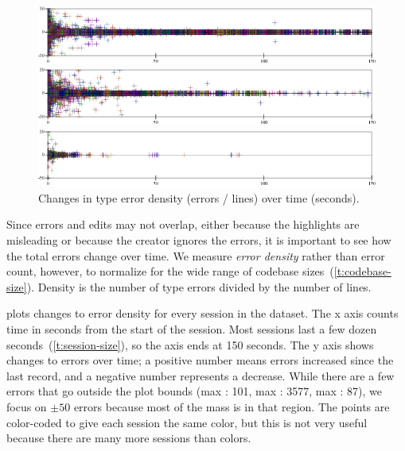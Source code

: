 \documentclass[english,submission,cleveref]{programming}
\begin{document}
\begin{figure}[t]\centering

  \mnocheck{}
  \includegraphics[width=\columnwidth]{img/error-count-nocheck-row--te-density-diff.pdf}
  \smallskip

  \mnonstrict{}
  \includegraphics[width=\columnwidth]{img/error-count-nonstrict-row--te-density-diff.pdf}
  \smallskip

  \mstrict{}
  \includegraphics[width=\columnwidth]{img/error-count-strict-row--te-density-diff.pdf}
  \caption{Changes in type error density (errors / lines) over time (seconds).}
  \label{f:error-density}
\end{figure}

Since errors and edits may not overlap, either because the highlights
are misleading or because the creator ignores the errors, it is important
to see how the total errors change over time.
We measure \emph{error density} rather than error count, however,
to normalize for the wide range of codebase sizes~(\cref{t:codebase-size}).
Density is the number of type errors divided by the number of lines.

 plots changes to error density for every session in the dataset.
The x axis counts time in seconds from the start of the session.
Most sessions last a few dozen seconds~(\cref{t:session-size}), so the axis
ends at 150 seconds.
The y axis shows changes to errors over time; a positive number means errors
increased since the last record, and a negative number represents a decrease.
While there are a few errors that go outside the plot bounds
(max \mnocheck{}: 101, max \mnonstrict{}: 3577, max \mstrict{}: 87), we focus
on $\pm{}50$ errors because most of the mass is in that region.
The points are color-coded to give each session the same color, but this is not
very useful because there are many more sessions than colors.
\end{document}
